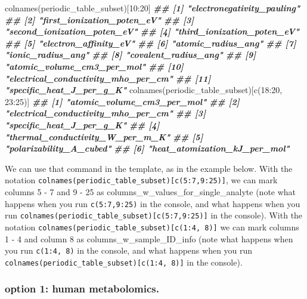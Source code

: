 \documentclass[
]{krantz}
\newenvironment{Shaded}{\begin{snugshade}}{\end{snugshade}}
\newcommand{\DecValTok}[1]{\textcolor[rgb]{0.00,0.00,0.81}{#1}}
\newcommand{\DocumentationTok}[1]{\textcolor[rgb]{0.56,0.35,0.01}{\textbf{\textit{#1}}}}
\newcommand{\FunctionTok}[1]{\textcolor[rgb]{0.00,0.00,0.00}{#1}}
\newcommand{\NormalTok}[1]{#1}
\newcommand{\SpecialCharTok}[1]{\textcolor[rgb]{0.00,0.00,0.00}{#1}}
\begin{document}
\begin{Shaded}
\begin{Highlighting}[]
\FunctionTok{colnames}\NormalTok{(periodic\_table\_subset)[}\DecValTok{10}\SpecialCharTok{:}\DecValTok{20}\NormalTok{]}
\DocumentationTok{\#\#  [1] "electronegativity\_pauling"         }
\DocumentationTok{\#\#  [2] "first\_ionization\_poten\_eV"         }
\DocumentationTok{\#\#  [3] "second\_ionization\_poten\_eV"        }
\DocumentationTok{\#\#  [4] "third\_ionization\_poten\_eV"         }
\DocumentationTok{\#\#  [5] "electron\_affinity\_eV"              }
\DocumentationTok{\#\#  [6] "atomic\_radius\_ang"                 }
\DocumentationTok{\#\#  [7] "ionic\_radius\_ang"                  }
\DocumentationTok{\#\#  [8] "covalent\_radius\_ang"               }
\DocumentationTok{\#\#  [9] "atomic\_volume\_cm3\_per\_mol"         }
\DocumentationTok{\#\# [10] "electrical\_conductivity\_mho\_per\_cm"}
\DocumentationTok{\#\# [11] "specific\_heat\_J\_per\_g\_K"}
\FunctionTok{colnames}\NormalTok{(periodic\_table\_subset)[}\FunctionTok{c}\NormalTok{(}\DecValTok{18}\SpecialCharTok{:}\DecValTok{20}\NormalTok{, }\DecValTok{23}\SpecialCharTok{:}\DecValTok{25}\NormalTok{)]}
\DocumentationTok{\#\# [1] "atomic\_volume\_cm3\_per\_mol"         }
\DocumentationTok{\#\# [2] "electrical\_conductivity\_mho\_per\_cm"}
\DocumentationTok{\#\# [3] "specific\_heat\_J\_per\_g\_K"           }
\DocumentationTok{\#\# [4] "thermal\_conductivity\_W\_per\_m\_K"    }
\DocumentationTok{\#\# [5] "polarizability\_A\_cubed"            }
\DocumentationTok{\#\# [6] "heat\_atomization\_kJ\_per\_mol"}
\end{Highlighting}
\end{Shaded}

We can use that command in the template, as in the example below. With the notation \texttt{colnames(periodic\_table\_subset){[}c(5:7,9:25){]}}, we can mark columns 5 - 7 and 9 - 25 as columns\_w\_values\_for\_single\_analyte (note what happens when you run \texttt{c(5:7,9:25)} in the console, and what happens when you run \texttt{colnames(periodic\_table\_subset){[}c(5:7,9:25){]}} in the console). With the notation \texttt{colnames(periodic\_table\_subset){[}c(1:4,\ 8){]}} we can mark columns 1 - 4 and column 8 as columns\_w\_sample\_ID\_info (note what happens when you run \texttt{c(1:4,\ 8)} in the console, and what happens when you run \texttt{colnames(periodic\_table\_subset){[}c(1:4,\ 8){]}} in the console).

\hypertarget{option-1-human-metabolomics.}{%
\subsubsection{option 1: human metabolomics.}\label{option-1-human-metabolomics.}}
\end{document}
